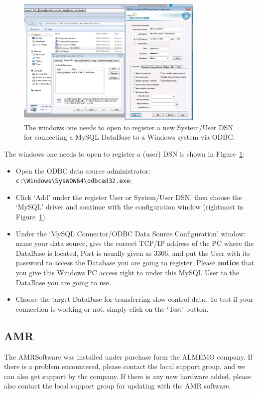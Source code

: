 \documentclass[a4paper,12pt]{scrartcl}
\begin{document}
\begin{figure}[!ht]
\centering
\includegraphics[width=0.8\textwidth]{figs/ODBC.png}
\caption{The windows one needs to open to register a new System/User DSN for connecting a MySQL DataBase to a Windows system via ODBC.}
\label{fig:dsn}
\end{figure}

The windows one needs to open to register a (user) DSN is shown in Figure~\ref{fig:dsn}:
\begin{itemize}
  \item Open the ODBC data source administrator: \verb|c:\Windows\SysWOW64\odbcad32.exe|;
  \item Click `Add' under the register User or System/User DSN, then choose the `MySQL' driver and continue with the configuration window (rightmost in Figure~\ref{fig:dsn}).
  \item Under the `MySQL Connector/ODBC Data Source Configuration' window: name your data source, give the correct TCP/IP address of the PC where the DataBase is located, Port is usually given as 3306, and put the User with its password to access the Database you are going to register. Please \textbf{notice} that you give this Windows PC access right to under this MySQL User to the DataBase you are going to use.
  \item Choose the target DataBase for transferring slow control data. To test if your connection is working or not, simply click on the `Test' button.
\end{itemize}

\subsection{AMR}
The AMRSoftware was installed under purchase form the ALMEMO company. If there is a problem encountered, please contact the local support group, and we can also get support by the company. If there is any new hardware added, please also contact the local support group for updating with the AMR software.
\end{document}
